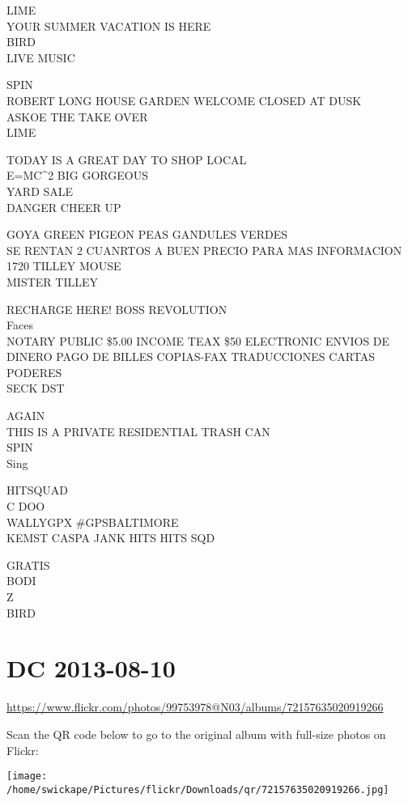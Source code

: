\documentclass[10pt,letterpaper]{article}
\begin{document}
LIME\\
YOUR SUMMER VACATION IS HERE\\
BIRD\\
LIVE MUSIC

SPIN\\
ROBERT LONG HOUSE GARDEN WELCOME CLOSED AT DUSK\\
ASKOE THE TAKE OVER\\
LIME

TODAY IS A GREAT DAY TO SHOP LOCAL\\
E=MC\^{}2 BIG GORGEOUS\\
YARD SALE\\
DANGER CHEER UP

GOYA GREEN PIGEON PEAS GANDULES VERDES\\
SE RENTAN 2 CUANRTOS A BUEN PRECIO PARA MAS INFORMACION\\
1720 TILLEY MOUSE\\
MISTER TILLEY

RECHARGE HERE!  BOSS REVOLUTION\\
Faces\\
NOTARY PUBLIC \$5.00 INCOME TEAX \$50 ELECTRONIC ENVIOS DE DINERO PAGO DE BILLES COPIAS{-}FAX TRADUCCIONES CARTAS PODERES\\
SECK DST

AGAIN\\
THIS IS A PRIVATE RESIDENTIAL TRASH CAN\\
SPIN\\
Sing

HITSQUAD\\
C DOO\\
WALLYGPX \#GPSBALTIMORE\\
KEMST CASPA JANK HITS HITS SQD

GRATIS\\
BODI\\
Z\\
BIRD
\pagebreak

\section*{DC 2013-08-10}

\url{https://www.flickr.com/photos/99753978@N03/albums/72157635020919266}

Scan the QR code below to go to the original album with full-size photos on Flickr:

\texttt{[image: /home/swickape/Pictures/flickr/Downloads/qr/72157635020919266.jpg]}
\pagebreak
\end{document}
